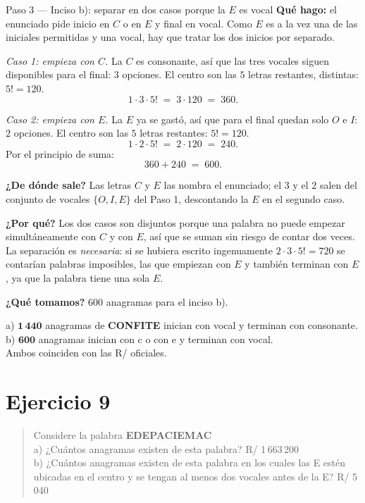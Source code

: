 \documentclass[11pt]{article}
\begin{document}
\begin{paso}{Paso 3 --- Inciso b): separar en dos casos porque la $E$ es vocal}
\textbf{Qué hago:} el enunciado pide inicio en $C$ o en $E$ y final en vocal. Como $E$ es a la vez una de
las iniciales permitidas y una vocal, hay que tratar los dos inicios por separado.

\emph{Caso 1: empieza con $C$.} La $C$ es consonante, así que las tres vocales siguen disponibles para el
final: $3$ opciones. El centro son las $5$ letras restantes, distintas: $5!=120$.
\[
1\cdot 3\cdot 5! \;=\; 3\cdot 120 \;=\; 360 .
\]

\emph{Caso 2: empieza con $E$.} La $E$ ya se gastó, así que para el final quedan solo $O$ e $I$:
$2$ opciones. El centro son las $5$ letras restantes: $5!=120$.
\[
1\cdot 2\cdot 5! \;=\; 2\cdot 120 \;=\; 240 .
\]
Por el principio de suma:
\[
360 + 240 \;=\; 600 .
\]

\textbf{¿De dónde sale?} Las letras $C$ y $E$ las nombra el enunciado; el $3$ y el $2$ salen del conjunto de
vocales $\{O,I,E\}$ del Paso 1, descontando la $E$ en el segundo caso.

\textbf{¿Por qué?} Los dos casos son disjuntos porque una palabra no puede empezar simultáneamente con $C$ y
con $E$, así que se suman sin riesgo de contar dos veces. La separación es \emph{necesaria}: si se hubiera
escrito ingenuamente $2\cdot 3\cdot 5!=720$ se contarían palabras imposibles, las que empiezan con $E$ y
también terminan con $E$, ya que la palabra tiene una sola $E$.

\textbf{¿Qué tomamos?} $600$ anagramas para el inciso b).
\end{paso}

\begin{resp}
a) $\mathbf{1\,440}$ anagramas de \textbf{CONFITE} inician con vocal y terminan con consonante.\\
b) $\mathbf{600}$ anagramas inician con c o con e y terminan con vocal.\\
Ambos coinciden con las R/ oficiales.
\end{resp}

\section*{Ejercicio 9}

\begin{quote}
Considere la palabra \textbf{EDEPACIEMAC}\\
a) ¿Cuántos anagramas existen de esta palabra? \hfill R/ 1\,663\,200\\
b) ¿Cuántos anagramas existen de esta palabra en los cuales las E estén ubicadas en el centro y se tengan al
menos dos vocales antes de la E? \hfill R/ 5\,040
\end{quote}
\end{document}
